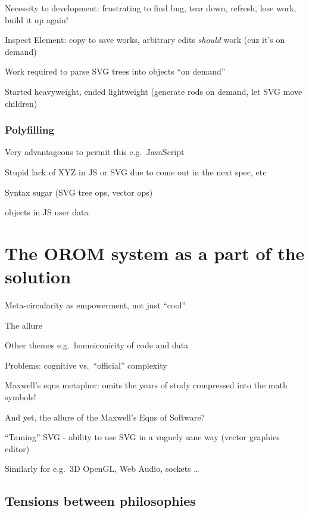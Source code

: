 \documentclass[english,submission]{programming}
\begin{document}
  Necessity to development: frustrating to find bug, tear down, refresh,
  lose work, build it up again!

  Inspect Element: copy to save works, arbitrary edits \emph{should} work
  (cuz it's on demand)

  Work required to parse SVG trees into objects ``on demand''

  Started heavyweight, ended lightweight (generate rods on demand, let SVG
  move children)

  \hypertarget{polyfilling}{%
  \subsubsection{Polyfilling}\label{polyfilling}}

  Very advantageous to permit this e.g.~JavaScript

  Stupid lack of XYZ in JS or SVG due to come out in the next spec, etc

  Syntax sugar (SVG tree ops, vector ops)

  objects in JS user data

  \hypertarget{the-orom-system-as-a-part-of-the-solution}{%
  \section{The OROM system as a part of the
  solution}\label{the-orom-system-as-a-part-of-the-solution}}

  Meta-circularity as empowerment, not just ``cool''

  The allure

  Other themes e.g.~homoiconicity of code and data

  Problems: cognitive vs.~``official'' complexity

  Maxwell's eqns metaphor: omits the years of study compressed into the
  math symbols!

  And yet, the allure of the Maxwell's Eqns of Software?

  ``Taming'' SVG - ability to use SVG in a vaguely sane way (vector
  graphics editor)

  Similarly for e.g.~3D OpenGL, Web Audio, sockets \ldots{}

  \hypertarget{tensions-between-philosophies}{%
  \subsection{Tensions between
  philosophies}\label{tensions-between-philosophies}}
\end{document}

